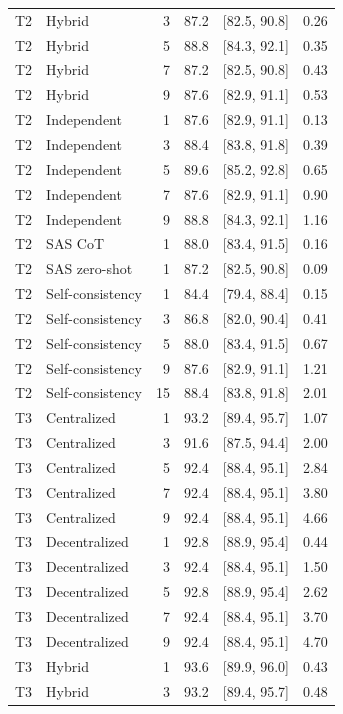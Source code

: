 \begin{tabular}{@{}llrrrr@{}}
T2 & Hybrid & 3 & 87.2 & [82.5, 90.8] & 0.26 \\
T2 & Hybrid & 5 & 88.8 & [84.3, 92.1] & 0.35 \\
T2 & Hybrid & 7 & 87.2 & [82.5, 90.8] & 0.43 \\
T2 & Hybrid & 9 & 87.6 & [82.9, 91.1] & 0.53 \\
T2 & Independent & 1 & 87.6 & [82.9, 91.1] & 0.13 \\
T2 & Independent & 3 & 88.4 & [83.8, 91.8] & 0.39 \\
T2 & Independent & 5 & 89.6 & [85.2, 92.8] & 0.65 \\
T2 & Independent & 7 & 87.6 & [82.9, 91.1] & 0.90 \\
T2 & Independent & 9 & 88.8 & [84.3, 92.1] & 1.16 \\
T2 & SAS CoT & 1 & 88.0 & [83.4, 91.5] & 0.16 \\
T2 & SAS zero-shot & 1 & 87.2 & [82.5, 90.8] & 0.09 \\
T2 & Self-consistency & 1 & 84.4 & [79.4, 88.4] & 0.15 \\
T2 & Self-consistency & 3 & 86.8 & [82.0, 90.4] & 0.41 \\
T2 & Self-consistency & 5 & 88.0 & [83.4, 91.5] & 0.67 \\
T2 & Self-consistency & 9 & 87.6 & [82.9, 91.1] & 1.21 \\
T2 & Self-consistency & 15 & 88.4 & [83.8, 91.8] & 2.01 \\
T3 & Centralized & 1 & 93.2 & [89.4, 95.7] & 1.07 \\
T3 & Centralized & 3 & 91.6 & [87.5, 94.4] & 2.00 \\
T3 & Centralized & 5 & 92.4 & [88.4, 95.1] & 2.84 \\
T3 & Centralized & 7 & 92.4 & [88.4, 95.1] & 3.80 \\
T3 & Centralized & 9 & 92.4 & [88.4, 95.1] & 4.66 \\
T3 & Decentralized & 1 & 92.8 & [88.9, 95.4] & 0.44 \\
T3 & Decentralized & 3 & 92.4 & [88.4, 95.1] & 1.50 \\
T3 & Decentralized & 5 & 92.8 & [88.9, 95.4] & 2.62 \\
T3 & Decentralized & 7 & 92.4 & [88.4, 95.1] & 3.70 \\
T3 & Decentralized & 9 & 92.4 & [88.4, 95.1] & 4.70 \\
T3 & Hybrid & 1 & 93.6 & [89.9, 96.0] & 0.43 \\
T3 & Hybrid & 3 & 93.2 & [89.4, 95.7] & 0.48 \\

\end{tabular}
